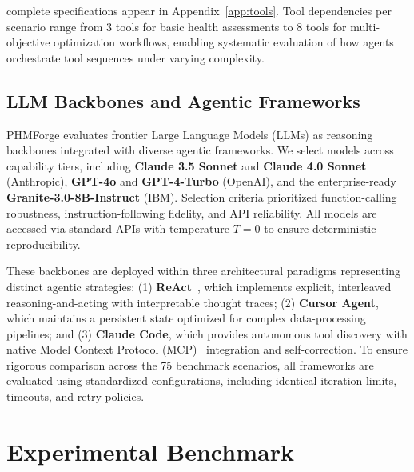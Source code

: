 \documentclass[sigconf,review]{acmart}
\begin{document}
  complete specifications appear in Appendix~\ref{app:tools}. Tool dependencies per        
  scenario       
  range from 3 tools for basic health assessments to 8 tools for multi-objective
  optimization              
  workflows, enabling systematic evaluation of how agents orchestrate tool sequences under 
  varying complexity.                            


\subsection{LLM Backbones and Agentic Frameworks}
PHMForge evaluates frontier Large Language Models (LLMs) as reasoning backbones integrated with diverse agentic frameworks. We select models across capability tiers, including \textbf{Claude 3.5 Sonnet} and \textbf{Claude 4.0 Sonnet} (Anthropic), \textbf{GPT-4o} and \textbf{GPT-4-Turbo} (OpenAI), and the enterprise-ready \textbf{Granite-3.0-8B-Instruct} (IBM). Selection criteria prioritized function-calling robustness, instruction-following fidelity, and API reliability. All models are accessed via standard APIs with temperature $T=0$ to ensure deterministic reproducibility.

These backbones are deployed within three architectural paradigms representing distinct agentic strategies:
(1) \textbf{ReAct}~\cite{yao2023reactsynergizingreasoningacting}, which implements explicit, interleaved reasoning-and-acting with interpretable thought traces; 
(2) \textbf{Cursor Agent}, which maintains a persistent state optimized for complex data-processing pipelines; and 
(3) \textbf{Claude Code}, which provides autonomous tool discovery with native Model Context Protocol (MCP)~\cite{cursor_docs} integration and self-correction. 
To ensure rigorous comparison across the 75 benchmark scenarios, all frameworks are evaluated using standardized configurations, including identical iteration limits, timeouts, and retry policies.

\section{Experimental Benchmark}
\end{document}
